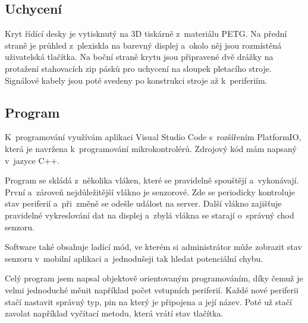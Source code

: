 \subsection{Uchycení}
Kryt řídící desky je vytisknutý na 3D tiskárně z~materiálu PETG.
Na přední straně je průhled z~plexiskla na barevný displej a~okolo něj jsou rozmístěná uživatelská tlačítka.
Na boční straně krytu jsou připravené dvě drážky na protažení stahovacích zip pásků pro uchycení na sloupek pletacího stroje.
Signálové kabely jsou poté svedeny po konstrukci stroje až k~periferiím.


\subsection{Program}
K~programování využívám aplikaci Visual Studio Code s~rozšířením PlatformIO, která je navržena k~programování mikrokontrolérů. 
Zdrojový kód mám napsaný v~jazyce C++.

Program se skládá z~několika vláken, které se pravidelně spouštějí a~vykonávají.
První a~zároveň nejdůležitější vlákno je senzorové.
Zde se periodicky kontroluje stav periferií a~při~změně se odešle událost na server.
Další vlákno zajišťuje pravidelné vykreslování dat na displej a~zbylá vlákna se starají o~správný chod senzoru.

Software také obsahuje ladící mód, ve kterém si administrátor může zobrazit stav senzoru v~mobilní aplikaci a~jednodušeji tak hledat potenciální chybu.

Celý program jsem napsal objektově orientovaným programováním, díky čemuž je velmi jednoduché měnit například počet vstupních periferií.
Každé nové periferii stačí nastavit správný typ, pin na který je připojena a její název.
Poté už stačí zavolat například vyčítací metodu, která vrátí stav tlačítka.


